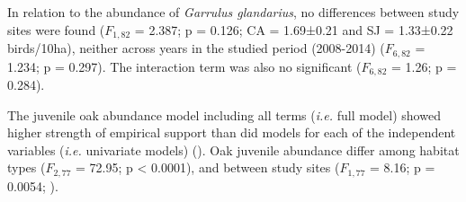 \begin{table}
\caption{Forest attributes of northern (SJ) and southern (CA) sites. U Mann-Withney statistics with significance at 0.05 level. Mean and SE are shown}
\centering
{}
\label{tab:coloniza:forest}
\end{table}

In relation to the abundance of \emph{Garrulus glandarius}, no differences between study sites were found (\(F_{1,82}\) = 2.387; p = 0.126; CA = 1.69±0.21 and SJ = 1.33±0.22 birds/10ha), neither across years in the studied period (2008-2014) (\(F_{6,82}\) = 1.234; p = 0.297). The interaction term was also no significant (\(F_{6,82}\) = 1.26; p = 0.284).

The juvenile oak abundance model including all terms (\emph{i.e.} full model) showed higher strength of empirical support than did models for each of the independent variables (\emph{i.e.} univariate models) (). Oak juvenile abundance differ among habitat types (\(F_{2,77}\) = 72.95; p < 0.0001), and between study sites (\(F_{1,77}\) = 8.16; p = 0.0054; ). 

